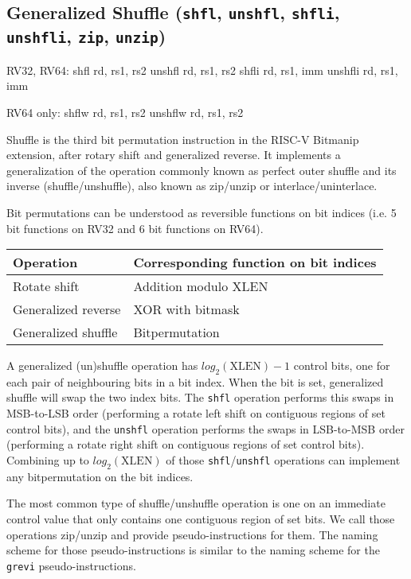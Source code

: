 \subsection{Generalized Shuffle (\texttt{shfl}, \texttt{unshfl}, \texttt{shfli}, \texttt{unshfli}, \texttt{zip}, \texttt{unzip})}
\label{gzip}

\begin{rvb}
  RV32, RV64:
    shfl    rd, rs1, rs2
    unshfl  rd, rs1, rs2
    shfli   rd, rs1, imm
    unshfli rd, rs1, imm

  RV64 only:
    shflw    rd, rs1, rs2
    unshflw  rd, rs1, rs2
\end{rvb}

Shuffle is the third bit permutation instruction in the RISC-V Bitmanip
extension, after rotary shift and generalized reverse. It implements a
generalization of the operation commonly known as perfect outer shuffle and its
inverse (shuffle/unshuffle), also known as zip/unzip or interlace/uninterlace.

Bit permutations can be understood as reversible functions on bit indices (i.e.
5 bit functions on RV32 and 6 bit functions on RV64).

\begin{center}
\begin{tabular}{l l}
Operation & Corresponding function on bit indices \\
\hline
Rotate shift & Addition modulo {\rm XLEN} \\
Generalized reverse & XOR with bitmask \\
Generalized shuffle & Bitpermutation \\
\end{tabular}
\end{center}

A generalized (un)shuffle operation has $log_2(\textrm{XLEN})-1$ control bits,
one for each pair of neighbouring bits in a bit index. When the bit is set,
generalized shuffle will swap the two index bits. The {\tt shfl} operation
performs this swaps in MSB-to-LSB order (performing a rotate left shift on
contiguous regions of set control bits), and the {\tt unshfl} operation performs
the swaps in LSB-to-MSB order (performing a rotate right shift on contiguous
regions of set control bits). Combining up to $log_2(\textrm{XLEN})$ of those
{\tt shfl}/{\tt unshfl} operations can implement any bitpermutation on the
bit indices.

The most common type of shuffle/unshuffle operation is one on an immediate
control value that only contains one contiguous region of set bits. We call
those operations zip/unzip and provide pseudo-instructions for them. The naming
scheme for those pseudo-instructions is similar to the naming scheme for the
{\tt grevi} pseudo-instructions.

